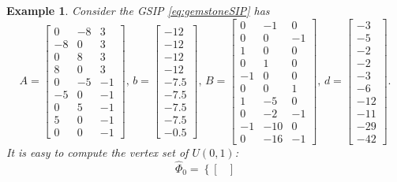 \documentclass{amsart}
\theoremstyle{plain}
\newtheorem{exmp}[theorem]{Example}
\numberwithin{equation}{section}
\begin{document}
	\begin{exmp}
		\label{PLME_18}\rm
		Consider the GSIP \eqref{eq:gemstoneSIP} has
		\[
		A = \left[\begin{array}{rrr}
			0 & -8 & 3 \\
			-8 & 0 & 3 \\
			0 & 8 & 3 \\
			8 & 0 & 3 \\
			0 & -5 & -1 \\
			-5 & 0 & -1 \\
			0 & 5 & -1 \\
			5 & 0 & -1 \\
			0 & 0 & -1
		\end{array}\right],\,
		b = \begin{bmatrix}
			-12 \\
			-12 \\
			-12 \\
			-12 \\
			-7.5 \\
			-7.5 \\
			-7.5 \\
			-7.5 \\
			-0.5
		\end{bmatrix},\,
		B=\left[\begin{array}{rrr}
			0 & -1 & 0\\ 
			0 & 0 & -1\\
			1 & 0  & 0\\
			0 & 1  & 0\\
			-1 & 0 &  0\\
			0 & 0 & 1\\
			1 & -5 & 0\\
			0 & -2 & -1\\
			-1 & -10 &  0\\
			0 & -16 & -1
		\end{array}\right],\,
		d=\begin{bmatrix}
			-3\\
			-5\\
			-2\\
			-2\\
			-3\\
			-6\\
			-12\\
			-11\\
			-29\\
			-42
		\end{bmatrix}.
		\]
		It is easy to compute the vertex set of $U(0,1)$:
		\[ \hat{\Phi}_0 = \left\{
		\begin{bmatrix}

\end{bmatrix}\]
\end{exmp}
\end{document}
